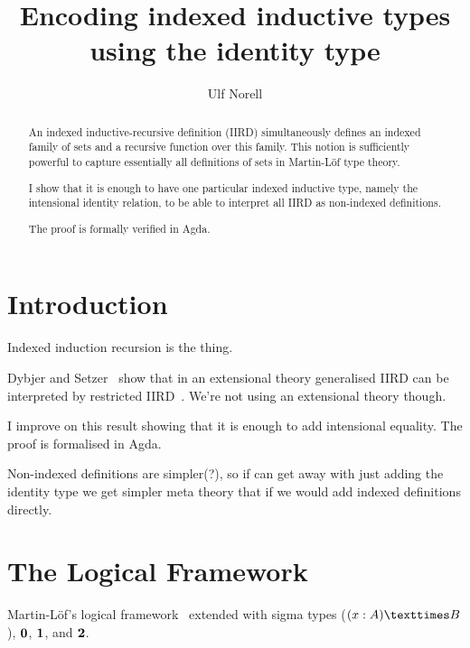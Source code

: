 \documentclass[11pt]{article}
\title{Encoding indexed inductive types using the identity type}
\author{Ulf Norell}
\begin{document}
\maketitle
\begin{abstract}
    An indexed inductive-recursive definition (IIRD) simultaneously defines an
    indexed family of sets and a recursive function over this family.  This
    notion is sufficiently powerful to capture essentially all definitions of
    sets in Martin-Löf type theory.

    I show that it is enough to have one particular indexed inductive type,
    namely the intensional identity relation, to be able to interpret all IIRD
    as non-indexed definitions.
    
    The proof is formally verified in Agda.
\end{abstract}

\section{Introduction}


Indexed induction recursion is the thing.


Dybjer and Setzer~\cite{dybjer:indexed-ir} show that in an extensional theory
generalised IIRD can be interpreted by restricted IIRD~\cite{dybjer:jsl}. We're
not using an extensional theory though.



I improve on this result showing that it is enough to add intensional equality.
The proof is formalised in Agda.

Non-indexed definitions are simpler(?), so if can get away with just adding the
identity type we get simpler meta theory that if we would add indexed
definitions directly.

\section{The Logical Framework}

    Martin-Löf's logical framework~\cite{nordstrom:book} extended with sigma
    types ($\SIGMA x A B$), $\mathbf{{0}}$, $\mathbf{{1}}$, and $\mathbf{{2}}$.

\end{document}
